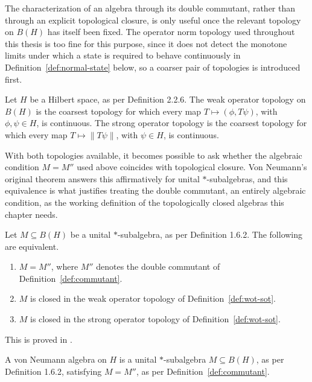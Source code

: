 The characterization of an algebra through its double commutant, rather
than through an explicit topological closure, is only useful once the
relevant topology on $B(H)$ has itself been fixed. The operator norm
topology used throughout this thesis is too fine for this purpose,
since it does not detect the monotone limits under which a state is
required to behave continuously in Definition~\ref{def:normal-state}
below, so a coarser pair of topologies is introduced first.

\begin{definition}\label{def:wot-sot}
	Let $H$ be a Hilbert space, as per Definition 2.2.6. The weak operator
	topology on $B(H)$ is the coarsest topology for which every map
	$T \mapsto (\phi, T\psi)$, with $\phi, \psi \in H$, is continuous. The
	strong operator topology is the coarsest topology for which every map
	$T \mapsto \lVert T\psi \rVert$, with $\psi \in H$, is continuous.
\end{definition}

With both topologies available, it becomes possible to ask whether the
algebraic condition $M = M''$ used above coincides with topological
closure. Von Neumann's original theorem answers this affirmatively for
unital $*$-subalgebras, and this equivalence is what justifies treating
the double commutant, an entirely algebraic condition, as the working
definition of the topologically closed algebras this chapter needs.

\begin{theorem}\label{thm:bicommutant}
	Let $M \subseteq B(H)$ be a unital $*$-subalgebra, as per
	Definition 1.6.2. The following are equivalent.
	\begin{enumerate}
		\item $M = M''$, where $M''$ denotes the double commutant of
		Definition~\ref{def:commutant}.
		\item $M$ is closed in the weak operator topology of
		Definition~\ref{def:wot-sot}.
		\item $M$ is closed in the strong operator topology of
		Definition~\ref{def:wot-sot}.
	\end{enumerate}
\end{theorem}
\noindent This is proved in \cite[TODO: collocazione precisa]{TODO-vonNeumannBicommutant}.

\begin{definition}\label{def:vN-algebra}
	A von Neumann algebra on $H$ is a unital $*$-subalgebra
	$M \subseteq B(H)$, as per Definition 1.6.2, satisfying $M = M''$, as
	per Definition~\ref{def:commutant}.
\end{definition}

